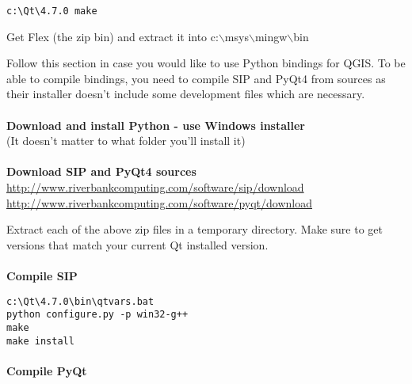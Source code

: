 \begin{verbatim}
c:\Qt\4.7.0 make 
\end{verbatim}

Get Flex
(the zip bin) and extract it into c:$\backslash$msys$\backslash$mingw$\backslash$bin

Follow this section in case you would like to use Python bindings for QGIS.  To
be able to compile bindings, you need to compile SIP and PyQt4 from sources as
their installer doesn't include some development files which are necessary.

\paragraph{}\textbf{Download and install Python - use Windows installer}\\

(It doesn't matter to what folder you'll install it)


\paragraph{}\textbf{Download SIP and PyQt4 sources}\\

\url{http://www.riverbankcomputing.com/software/sip/download}
\url{http://www.riverbankcomputing.com/software/pyqt/download}

Extract each of the above zip files in a temporary directory. Make sure
to get versions that match your current Qt installed version.

\paragraph{}\textbf{Compile SIP}\\

\begin{verbatim}
c:\Qt\4.7.0\bin\qtvars.bat 
python configure.py -p win32-g++ 
make 
make install 
\end{verbatim}

\paragraph{}\textbf{Compile PyQt}\\

